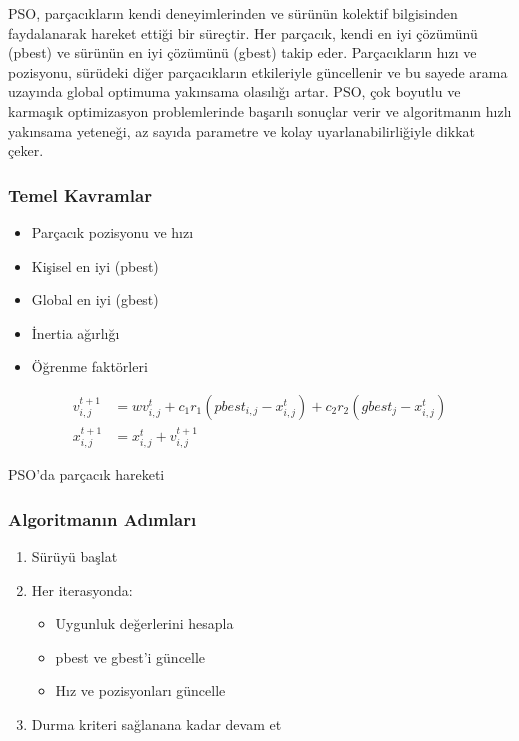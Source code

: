 PSO, parçacıkların kendi deneyimlerinden ve sürünün kolektif bilgisinden faydalanarak hareket ettiği bir süreçtir. Her parçacık, kendi en iyi çözümünü (pbest) ve sürünün en iyi çözümünü (gbest) takip eder. Parçacıkların hızı ve pozisyonu, sürüdeki diğer parçacıkların etkileriyle güncellenir ve bu sayede arama uzayında global optimuma yakınsama olasılığı artar. PSO, çok boyutlu ve karmaşık optimizasyon problemlerinde başarılı sonuçlar verir ve algoritmanın hızlı yakınsama yeteneği, az sayıda parametre ve kolay uyarlanabilirliğiyle dikkat çeker.

\subsubsection{Temel Kavramlar}
\begin{itemize}
    \item Parçacık pozisyonu ve hızı
    \item Kişisel en iyi (pbest)
    \item Global en iyi (gbest)
    \item İnertia ağırlığı
    \item Öğrenme faktörleri
\end{itemize}

\begin{equation}
\begin{aligned}
v_{i,j}^{t+1} &= w v_{i,j}^t + c_1r_1(pbest_{i,j} - x_{i,j}^t) + c_2r_2(gbest_j - x_{i,j}^t) \\
x_{i,j}^{t+1} &= x_{i,j}^t + v_{i,j}^{t+1}
\end{aligned}
\end{equation}

\begin{marginfigure}
\centering
{}
\caption{PSO'da parçacık hareketi}
\label{fig:pso_movement}
\end{marginfigure}

\subsubsection{Algoritmanın Adımları}
\begin{enumerate}
    \item Sürüyü başlat
    \item Her iterasyonda:
        \begin{itemize}
            \item Uygunluk değerlerini hesapla
            \item pbest ve gbest'i güncelle
            \item Hız ve pozisyonları güncelle
        \end{itemize}
    \item Durma kriteri sağlanana kadar devam et
\end{enumerate}

